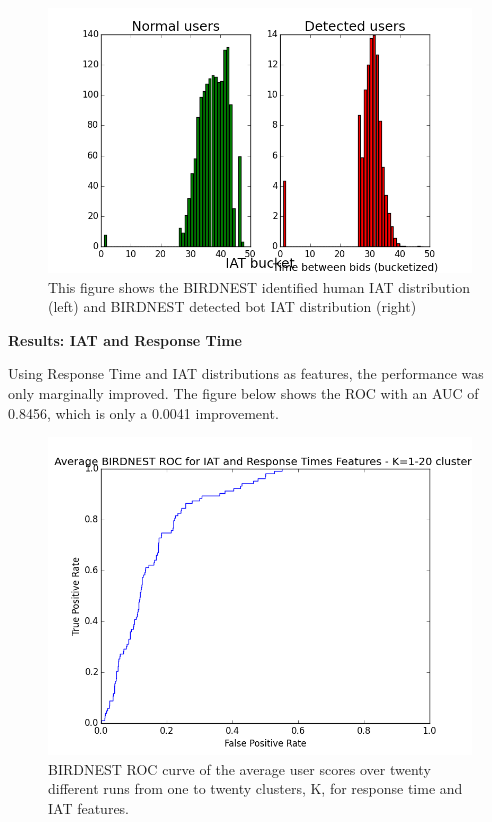 \documentclass{article} %
\begin{document}


\begin{figure}[h]
\centering
{\caption{This figure shows the BIRDNEST identified human IAT distribution (left) and BIRDNEST detected bot IAT distribution (right)} \includegraphics[scale=0.5]{img/bird_iat_pred.png}}
\end{figure}

\textbf{Results: IAT and Response Time}

Using Response Time and IAT distributions as features, the performance was only marginally improved.
The figure below shows the ROC with an AUC of 0.8456, which is only a 0.0041 improvement.

\begin{figure}[h]
\centering
{\caption{BIRDNEST ROC curve of the average user scores over twenty different runs from one to twenty clusters, K, for response time and IAT features.} \includegraphics[scale=0.47]{img/bird_roc.png}}
\end{figure}
\end{document}
